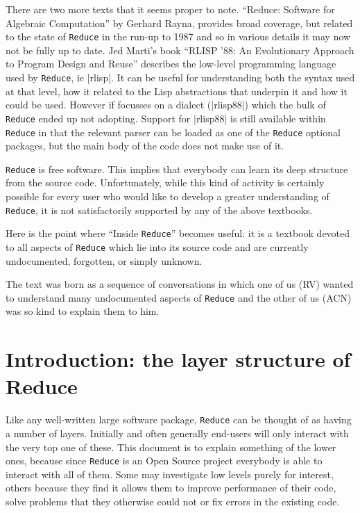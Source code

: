 \documentclass[12pt,twoside,openright]{memoir}
\newcommand{\reduce}{\texttt{Reduce}\xspace}
\begin{document}
There are two more texts that it seems proper to note.  ``Reduce: Software for
Algebraic Computation'' \cite{ray} by Gerhard Rayna, provides broad coverage,
but related to the state of \reduce in the run-up to 1987 and so in various
details it may now not be fully up to date. Jed Marti's book ``RLISP '88: An
Evolutionary Approach to Program Design and Reuse'' \cite{marti} describes the
low-level programming language used by \reduce, ie |rlisp|. It can be useful
for understanding both the syntax used at that level, how it related to the
Lisp abstractions that underpin it and how it could be used. However if
focusses on a dialect (|rlisp88|) which the bulk of \reduce ended up not
adopting. Support for |rlisp88| is still available within \reduce in that the
relevant parser can be loaded as one of the \reduce optional packages, but the
main body of the code does not make use of it.

\reduce is free software. This implies that everybody can learn its deep
structure from the source code. Unfortunately, while this kind of activity is
certainly possible for every user who would like to develop a greater
understanding of \reduce, it is not satisfactorily supported by any of the
above textbooks.

Here is the point where ``Inside \reduce'' becomes useful: it is a textbook
devoted to all aspects of \reduce which lie into its source code and are
currently undocumented, forgotten, or simply unknown.

The text was born as a sequence of conversations in which one of us (RV) wanted
to understand many undocumented aspects of \reduce and the other of us (ACN)
was so kind to explain them to him.

\cleardoublepage

\tableofcontents

\mainmatter
\sloppy

\chapter[Introduction]{Introduction: the layer structure of Reduce}

Like any well-written large software package, \reduce can be thought of
as having a number of layers. Initially and often generally end-users will
only interact with the very top one of these. This document is to explain
something of the lower ones, because since \reduce is an Open Source project
everybody is able to interact with all of them. Some may investigate low
levels purely for interest, others because they find it allows them to
improve performance of their code, solve problems that they otherwise could not
or fix errors in the existing code.
\end{document}
